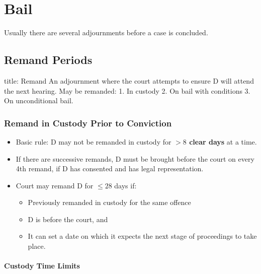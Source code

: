 \documentclass[
]{article}
\newenvironment{Shaded}{}{}
\newcommand{\NormalTok}[1]{#1}
\providecommand{\tightlist}{%
  \setlength{\itemsep}{0pt}\setlength{\parskip}{0pt}}
\begin{document}
\hypertarget{bail}{%
\section{Bail}\label{bail}}

Usually there are several adjournments before a case is concluded.

\hypertarget{remand-periods}{%
\subsection{Remand Periods}\label{remand-periods}}

\begin{Shaded}
\begin{Highlighting}[]
\NormalTok{title: Remand}
\NormalTok{An adjournment where the court attempts to ensure D will attend the next hearing. May be remanded:}
\NormalTok{1. In custody}
\NormalTok{2. On bail with conditions}
\NormalTok{3. On unconditional bail. }
\end{Highlighting}
\end{Shaded}

\hypertarget{remand-in-custody-prior-to-conviction}{%
\subsubsection{Remand in Custody Prior to
Conviction}\label{remand-in-custody-prior-to-conviction}}

\begin{itemize}
\tightlist
\item
  Basic rule: D may not be remanded in custody for \textbf{\(> 8\) clear
  days} at a time.
\item
  If there are successive remands, D must be brought before the court on
  every 4th remand, if D has consented and has legal representation.
\item
  Court may remand D for \(\leq 28\) days if:

  \begin{itemize}
  \tightlist
  \item
    Previously remanded in custody for the same offence
  \item
    D is before the court, and
  \item
    It can set a date on which it expects the next stage of proceedings
    to take place.
  \end{itemize}
\end{itemize}

\hypertarget{custody-time-limits}{%
\paragraph{Custody Time Limits}\label{custody-time-limits}}
\end{document}
